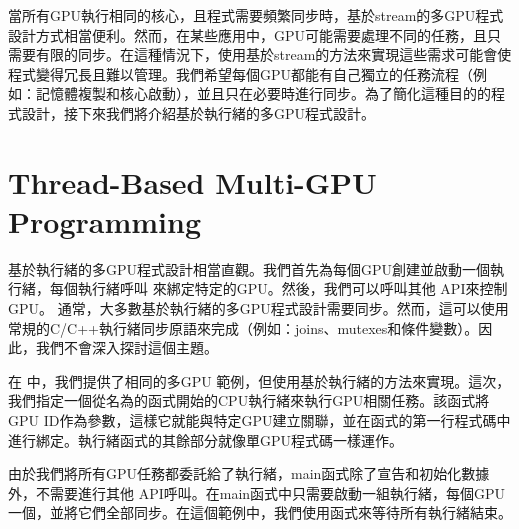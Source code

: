 當所有GPU執行相同的核心，且程式需要頻繁同步時，基於stream的多GPU程式設計方式相當便利。然而，在某些應用中，GPU可能需要處理不同的任務，且只需要有限的同步。在這種情況下，使用基於stream的方法來實現這些需求可能會使程式變得冗長且難以管理。我們希望每個GPU都能有自己獨立的任務流程（例如：記憶體複製和核心啟動），並且只在必要時進行同步。為了簡化這種目的的程式設計，接下來我們將介紹基於執行緒的多GPU程式設計。

\section{Thread-Based Multi-GPU Programming}

基於執行緒的多GPU程式設計相當直觀。我們首先為每個GPU創建並啟動一個執行緒，每個執行緒呼叫 來綁定特定的GPU。然後，我們可以呼叫其他 API來控制GPU。
通常，大多數基於執行緒的多GPU程式設計需要同步。然而，這可以使用常規的C/C++執行緒同步原語來完成（例如：joins、mutexes和條件變數）。因此，我們不會深入探討這個主題。

在  中，我們提供了相同的多GPU 範例，但使用基於執行緒的方法來實現。這次，我們指定一個從名為的函式開始的CPU執行緒來執行GPU相關任務。該函式將GPU ID作為參數，這樣它就能與特定GPU建立關聯，並在函式的第一行程式碼中進行綁定。執行緒函式的其餘部分就像單GPU程式碼一樣運作。

由於我們將所有GPU任務都委託給了執行緒，main函式除了宣告和初始化數據外，不需要進行其他 API呼叫。在main函式中只需要啟動一組執行緒，每個GPU一個，並將它們全部同步。在這個範例中，我們使用函式來等待所有執行緒結束。

